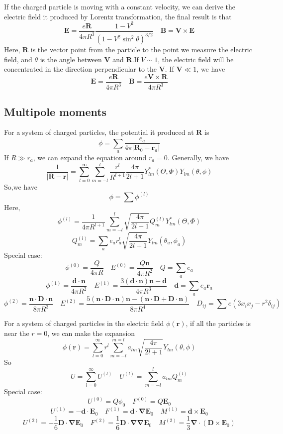 \documentclass[cyan]{elegantnote}
\begin{document}
If the charged particle is moving with a constant velocity, we can derive the electric field it produced by Lorentz transformation, the final result is that
\[\bm{E} = \frac{e\bm{R}}{4\pi R^3} \frac{1-V^2}{(1-V^2\sin^2\theta)^{3/2}} \quad \bm{B} = \bm{V} \times \bm{E}\]
Here, $\bm{R}$ is the vector point from the particle to the point we measure the electric field, and $\theta$ is the angle between $\bm{V}$ and $\bm{R}$.If $V \sim 1$, the electric field will be concentrated in the direction perpendicular to the $\bm{V}$. If $\bm{V} \ll 1$, we have
\[\bm{E} = \frac{e\bm{R}}{4\pi R^3} \quad \bm{B} = \frac{e\bm{V} \times\bm{R}}{4\pi R^3}\]

\subsection{Multipole moments}
For a system of charged particles, the potential it produced at $\bm{R}$ is
\[\phi = \sum_a \frac{e_a}{4\pi|\bm{R}_0 - \bm{r}_a|}\]
If $R \gg r_a$, we can expand the equation around $r_a=0$. Generally, we have
\[\frac{1}{|\bm{R} - \bm{r}|} = \sum_{l=0}^{\infty} \sum_{m=-l}^{l} \frac{r^l}{R^{l+1}} \frac{4\pi}{2l+1} Y^*_{lm}(\Theta,\Phi)Y_{lm}(\theta,\phi)\]
So,we have
\[\phi = \sum \phi^{(l)}\]
Here,
\[\phi^{(l)} = \frac{1}{4\pi R^{l+1}} \sum_{m=-l}^{l} \sqrt{\frac{4\pi}{2l+1}} Q_{m}^{(l)} Y^*_{lm}(\Theta,\Phi)\]
\[Q_m^{(l)} =\sum_a e_a r_a^l \sqrt{\frac{4\pi}{2l+1}} Y_{lm}(\theta_a,\phi_a)\]
Special case: 
\[\phi^{(0)} = \frac{Q}{4\pi R} \quad E^{(0)} = \frac{Q\bm{n}}{4\pi R^2} \quad Q = \sum_a e_a\]
\[\phi^{(1)} = \frac{\bm{d} \cdot \bm{n}}{4\pi R^2}  \quad E^{(1)} = \frac{3(\bm{d}\cdot\bm{n})\bm{n}-\bm{d}}{4\pi R^3} \quad \bm{d} = \sum_a e_a \bm{r}_a\]
\[\phi^{(2)} = \frac{\bm{n} \cdot \bm{D} \cdot \bm{n}}{8\pi R^3} \quad E^{(2)} = \frac{5(\bm{n} \cdot \bm{D} \cdot \bm{n})\bm{n} - (\bm{n} \cdot \bm{D} + \bm{D} \cdot \bm{n})}{8\pi R^4} \quad D_{ij} = \sum e(3x_ix_j-r^2\delta_{ij})\]

For a system of charged particles in the electric field $\phi(\bm{r})$, if all the particles is near the $r=0$, we can make the expansion
\[\phi(\bm{r}) = \sum_{l=0}^{\infty} r^l \sum_{m=-l}^{m=l} a_{lm} \sqrt{\frac{4\pi}{2l+1}} Y_{lm}(\theta,\phi)\]
So
\[U = \sum_{l=0}^{\infty} U^{(l)} \quad U^{(l)} = \sum_{m=-l}^{l} a_{lm}Q^{(l)}_m\]
Special case:
\[U^{(0)} = Q\phi_0 \quad F^{(0)} = Q\bm{E}_0\]
\[U^{(1)} = -\bm{d}\cdot \bm{E}_0 \quad F^{(1)} = \bm{d}\cdot \bm{\nabla}\bm{E}_0 \quad M^{(1)} = \bm{d} \times \bm{E}_0\]
\[U^{(2)} = -\frac{1}{6}\bm{D}\cdot \bm{\nabla}\bm{E}_0 \quad F^{(2)} = \frac{1}{6} \bm{D}\cdot \bm{\nabla}\bm{\nabla}\bm{E}_0 \quad M^{(2)} = \frac{1}{3} \bm{\nabla} \cdot (\bm{D} \times \bm{E}_0)\]
\end{document}
